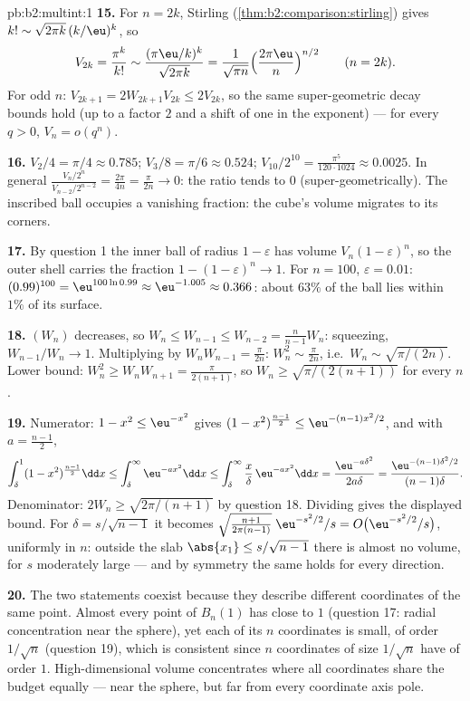 \begin{solution}{pb:b2:multint:1}
\textbf{15.} For $n = 2k$, Stirling
(\cref{thm:b2:comparison:stirling}) gives $k! \sim
\sqrt{2\pi k}\,(k/\eu)^k$, so
\[
V_{2k} = \frac{\pi^k}{k!}
\sim \frac{(\pi\eu/k)^k}{\sqrt{2\pi k}}
= \frac1{\sqrt{\pi n}}\Bigl(\frac{2\pi\eu}n\Bigr)^{n/2}
\qquad (n = 2k).
\]
For odd $n$: $V_{2k+1} = 2W_{2k+1}V_{2k} \leq 2V_{2k}$, so
the same super-geometric decay bounds hold (up to a factor
$2$ and a shift of one in the exponent) --- for every $q >
0$, $V_n = o(q^n)$.

\textbf{16.} $V_2/4 = \pi/4 \approx 0.785$; $V_3/8 = \pi/6
\approx 0.524$; $V_{10}/2^{10} = \frac{\pi^5}{120\cdot1024}
\approx 0.0025$. In general $\frac{V_n/2^n}{V_{n-2}/2^{n-2}}
= \frac{2\pi}{4n} = \frac{\pi}{2n} \to 0$: the ratio tends to
$0$ (super-geometrically). The inscribed ball occupies a
vanishing fraction: the cube's volume migrates to its
corners.

\textbf{17.} By question 1 the inner ball of radius $1 -
\varepsilon$ has volume $V_n(1-\varepsilon)^n$, so the outer
shell carries the fraction $1 - (1 - \varepsilon)^n \to 1$.
For $n = 100$, $\varepsilon = 0.01$: $(0.99)^{100} =
\eu^{100\ln0.99} \approx \eu^{-1.005} \approx 0.366$: about
$63\%$ of the ball lies within $1\%$ of its surface.

\textbf{18.} $(W_n)$ decreases, so $W_n \leq W_{n-1} \leq
W_{n-2} = \frac{n}{n-1}W_n$: squeezing, $W_{n-1}/W_n \to 1$.
Multiplying by $W_nW_{n-1} = \frac\pi{2n}$: $W_n^2 \sim
\frac\pi{2n}$, i.e.\ $W_n \sim \sqrt{\pi/(2n)}$. Lower bound:
$W_n^2 \geq W_nW_{n+1} = \frac{\pi}{2(n+1)}$, so $W_n \geq
\sqrt{\pi/(2(n+1))}$ for every $n$.

\textbf{19.} Numerator: $1 - x^2 \leq \eu^{-x^2}$ gives $(1 -
x^2)^{\frac{n-1}2} \leq \eu^{-(n-1)x^2/2}$, and with $a =
\frac{n-1}2$,
\[
\int_\delta^1(1 - x^2)^{\frac{n-1}2}\dd x
\leq \int_\delta^\infty\eu^{-ax^2}\dd x
\leq \int_\delta^\infty\frac x\delta\,\eu^{-ax^2}\dd x
= \frac{\eu^{-a\delta^2}}{2a\delta}
= \frac{\eu^{-(n-1)\delta^2/2}}{(n-1)\delta}.
\]
Denominator: $2W_n \geq \sqrt{2\pi/(n+1)}$ by question 18.
Dividing gives the displayed bound. For $\delta =
s/\sqrt{n-1}$ it becomes
$\sqrt{\tfrac{n+1}{2\pi(n-1)}}\;\eu^{-s^2/2}/s = O\bigl(
\eu^{-s^2/2}/s\bigr)$, uniformly in $n$: outside the slab
$\abs{x_1} \leq s/\sqrt{n-1}$ there is almost no volume, for
$s$ moderately large --- and by symmetry the same holds for
every direction.

\textbf{20.} The two statements coexist because they describe
different coordinates of the same point. Almost every point
of $B_n(1)$ has  close to $1$ (question 17: radial
concentration near the sphere), yet each of its $n$
coordinates is small, of order $1/\sqrt n$ (question 19),
which is consistent since $n$ coordinates of size $1/\sqrt n$
have  of order $1$. High-dimensional volume concentrates
where all coordinates share the  budget equally ---
near the sphere, but far from every coordinate axis pole.


\end{solution}
